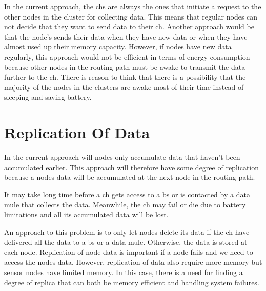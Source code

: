 \documentclass[USenglish]{uit-thesis}
\begin{document}


In the current approach, the \glspl{ch} are always the ones that initiate a request to the other nodes in the cluster for collecting data. This means that regular nodes can not decide that they want to send data to their \gls{ch}. Another approach would be that the node's sends their data when they have new data or when they have almost used up their memory capacity. However, if nodes have new data regularly, this approach would not be efficient in terms of energy consumption because other nodes in the routing path must be awake to transmit the data further to the \gls{ch}. There is reason to think that there is a possibility that the majority of the nodes in the clusters are awake most of their time instead of sleeping and saving battery. 





\section{Replication Of Data} \label{disc:repl_data}
In the current approach will nodes only accumulate data that haven't been accumulated earlier. This approach will therefore have some degree of replication because a nodes data will be accumulated at the next node in the routing path.

It may take long time before a \gls{ch} gets access to a \gls{bs} or is contacted by a data mule that collects the data. Meanwhile, the \gls{ch} may fail or die due to battery limitations and all its accumulated data will be lost.

An approach to this problem is to only let nodes delete its data if the \gls{ch} have delivered all the data to a \gls{bs} or a data mule. Otherwise, the data is stored at each node.
Replication of node data is important if a node fails and we need to access the nodes data. However, replication of data also require more memory but sensor nodes have limited memory. In this case, there is a need for finding a degree of replica that can both be memory efficient and handling system failures.
\end{document}
